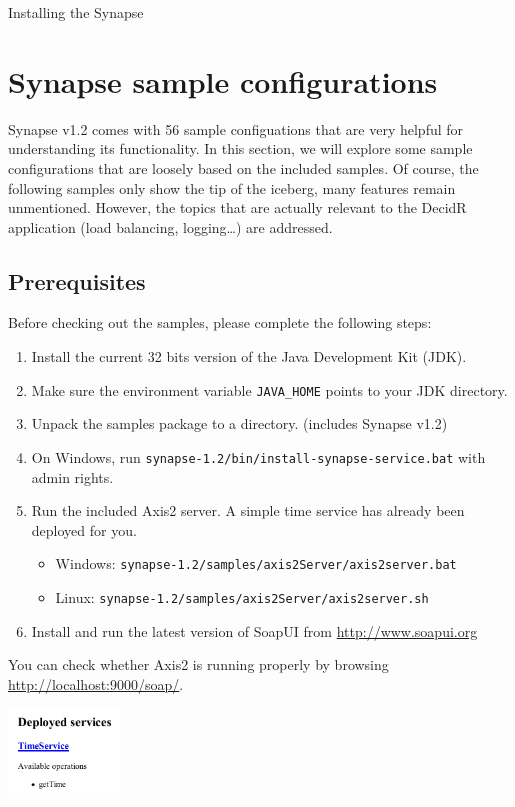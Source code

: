 Installing the Synapse

\section{Synapse sample configurations}
\label{chap:Synpase-sample-configurations}
\lstset{frame=single,
	    basicstyle=\tiny,
	    numbers=left,                   
		numberstyle=\tiny, 
	    commentstyle=\textit,
	    breaklines=true}

Synapse v1.2 comes with 56 sample configuations that are very helpful for
understanding its functionality. In this section, we will explore some sample
configurations that are loosely based on the included samples. Of course, the
following samples only show the tip of the iceberg, many features remain
unmentioned. However, the topics that are actually relevant to the DecidR
application (load balancing, logging\ldots) are addressed.

\subsection{Prerequisites}
\label{sec:prerequisites}

Before checking out the samples, please complete the following steps: 

\begin{enumerate}
\item Install the current 32 bits version of the Java Development Kit (JDK).
\item Make sure the environment variable \texttt{JAVA\_HOME} points to your JDK
directory.
\item Unpack the samples package to a directory. (includes Synapse
v1.2)
\item On Windows, run \texttt{synapse-1.2/bin/install-synapse-service.bat} with
admin rights.
\item Run the included Axis2 server. A simple time service has already
been deployed for you.
\begin{itemize}
  \item Windows: \texttt{synapse-1.2/samples/axis2Server/axis2server.bat}
  \item Linux: \texttt{synapse-1.2/samples/axis2Server/axis2server.sh}
\end{itemize}
\item Install and run the latest version of SoapUI from
\url{http://www.soapui.org}
\end{enumerate}

You can check whether Axis2 is running properly by browsing
\url{http://localhost:9000/soap/}.
\begin{center}
\includegraphics[width=3cm]{figures/axis2-success.pdf}
\end{center}

